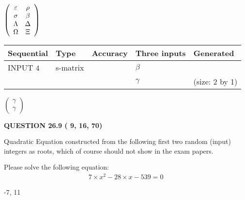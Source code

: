 \documentclass[12pt]{article}
\begin{document}
   
 $  \left( \begin{array}
 {
 c
 c
 }
 \varepsilon & 
 \rho \\ 
 \sigma & 
 \beta \\ 
 \Lambda & 
 \Delta \\ 
 \Omega & 
                    \Xi
 \end{array} \right) $ 
  
  
\noindent\begin{tabular}{|l|l|l|l|l|}
\hline
 Sequential & Type & Accuracy & Three inputs & Generated \\ 
\hline
 
 
  INPUT $           4$ & s-matrix & & 
 $  \beta $ & 
  \\
  & & & 
 $  \gamma $ & 
  (size:           2 by           1)
 \\  \hline  
 \end{tabular}
   
   
 $  \left( \begin{array}
 {
 c
 }
 \gamma \\ 
 \gamma
 \end{array} \right) $ 
  
\vspace{0.2in}
  
{\textbf{\Large{QUESTION
26.9 
 (          9,         16,         70)
}}}
  
  


\noindent{}
Quadratic Equation constructed from the following first two random (input) integers as roots,  
which of course should not show in the exam papers.  
\noindent{}


 
 

 
Please solve the following equation:
\begin{eqnarray*}
7 \times x^2  %
-28
                 \times x    %
-539 =0
\end{eqnarray*}
 
 
 
\noindent{}
 
 

-7,  %
11
 
 
 
\noindent{}
 
\end{document}
